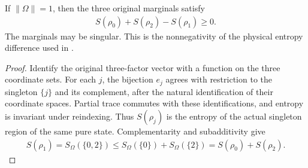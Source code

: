 \begin{theorem}
  \label{thm:physical_singleton_entropy_difference}
  \leanok
  If $\|\Omega\|=1$, then the three original marginals satisfy
  \begin{align*}
    S(\rho_0)+S(\rho_2)-S(\rho_1)\geq0.
  \end{align*}
  The marginals may be singular. This is the nonnegativity of the
  physical entropy difference used in
  \cite[Section~8]{OpenAI2026AreaLaw}.
\end{theorem}
\begin{proof}\leanok
  Identify the original three-factor vector with a function on the
  three coordinate sets. For each $j$, the bijection $e_j$ agrees with
  restriction to the singleton $\{j\}$ and its complement, after the
  natural identification of their coordinate spaces. Partial trace
  commutes with these identifications, and entropy is invariant under
  reindexing. Thus $S(\rho_j)$ is the entropy of the actual singleton
  region of the same pure state. Complementarity and subadditivity give
  \begin{align*}
    S(\rho_1)=S_\Omega(\{0,2\})
      \leq S_\Omega(\{0\})+S_\Omega(\{2\})
      =S(\rho_0)+S(\rho_2).
  \end{align*}
\end{proof}
